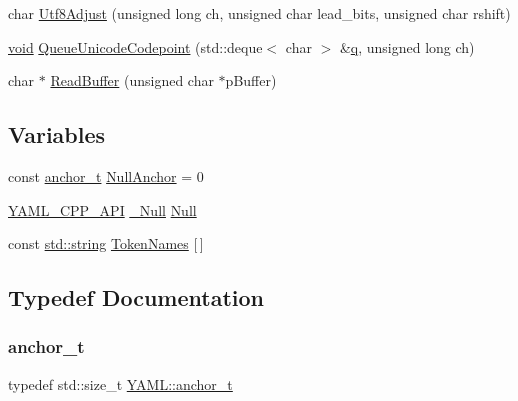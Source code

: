\begin{DoxyCompactItemize}
\item 
char \mbox{\hyperlink{namespace_y_a_m_l_a5753660cb2a032c19a94166ac376596e}{Utf8\+Adjust}} (unsigned long ch, unsigned char lead\+\_\+bits, unsigned char rshift)
\item 
\mbox{\hyperlink{glad_8h_a950fc91edb4504f62f1c577bf4727c29}{void}} \mbox{\hyperlink{namespace_y_a_m_l_a9db8b8c1393e8de3db93ec1857c2fe28}{Queue\+Unicode\+Codepoint}} (std\+::deque$<$ char $>$ \&\mbox{\hyperlink{glad_8h_a514729309336df22bcc8eda979d6ced4}{q}}, unsigned long ch)
\item 
char $\ast$ \mbox{\hyperlink{namespace_y_a_m_l_adb74728c1e3294063a8421807c083b16}{Read\+Buffer}} (unsigned char $\ast$p\+Buffer)
\end{DoxyCompactItemize}
\subsection*{Variables}
\begin{DoxyCompactItemize}
\item 
const \mbox{\hyperlink{namespace_y_a_m_l_abeff1798814ae3402fc5665fdcad1de6}{anchor\+\_\+t}} \mbox{\hyperlink{namespace_y_a_m_l_afaa46b90691d3783236a638ddd3d359c}{Null\+Anchor}} = 0
\item 
\mbox{\hyperlink{dll_8h_a70903db05b58f40db9aa4f966658fa65}{Y\+A\+M\+L\+\_\+\+C\+P\+P\+\_\+\+A\+PI}} \mbox{\hyperlink{struct_y_a_m_l_1_1___null}{\+\_\+\+Null}} \mbox{\hyperlink{namespace_y_a_m_l_a680351cadce6f018480604f751b2dc9c}{Null}}
\item 
const \mbox{\hyperlink{glad_8h_ac83513893df92266f79a515488701770}{std\+::string}} \mbox{\hyperlink{namespace_y_a_m_l_aec9756e666626c422c695eeb4250fbf9}{Token\+Names}} \mbox{[}$\,$\mbox{]}
\end{DoxyCompactItemize}


\subsection{Typedef Documentation}
\mbox{\label{namespace_y_a_m_l_abeff1798814ae3402fc5665fdcad1de6}} 
\subsubsection{\texorpdfstring{anchor\_t}{anchor\_t}}
{\footnotesize\ttfamily typedef std\+::size\+\_\+t \mbox{\hyperlink{namespace_y_a_m_l_abeff1798814ae3402fc5665fdcad1de6}{Y\+A\+M\+L\+::anchor\+\_\+t}}}



